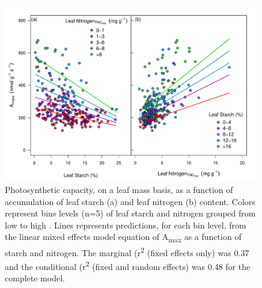 \documentclass[a4paper]{article}\usepackage[]{graphicx}\usepackage[]{color}
\begin{document}
\begin{figure}[h!]
    \centering
    \includegraphics[width=0.99\textwidth]{A_leafchem.pdf}
    \caption{Photosynthetic capacity, on a leaf mass basis, as a function of accumulation of leaf starch (a) and leaf nitrogen  (b) content.  Colors represent bins levels (n=5) of leaf starch and nitrogen grouped from low to high .  Lines represents predictions, for each bin level, from the linear mixed effects model equation of A\textsubscript{max} as a function of starch and nitrogen. The marginal (r\textsuperscript{2} (fixed effects only) was 0.37 and the conditional (r\textsuperscript{2} (fixed and random effects) was 0.48 for the complete model.}
    \label{fig:figure5}
\end{figure}
\end{document}
